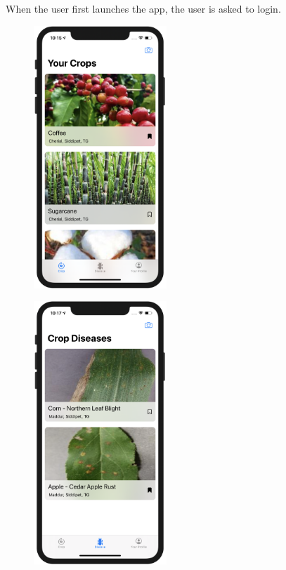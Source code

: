 \documentclass[../Report.tex]{subfiles}
\begin{document}
\noindent When the user first launches the app, the user is asked to login.

\begin{figure}[H]
    \centering
    \begin{minipage}{.5\textwidth}
      \centering
      \includegraphics[width=5cm]{images/crop.png}
      \label{fig:ss_crop}
    \end{minipage}%
    \begin{minipage}{.5\textwidth}
      \centering
      \includegraphics[width=5cm]{images/disease.png}
      \label{fig:ss_disease}
    \end{minipage}
\end{figure}
\end{document}
